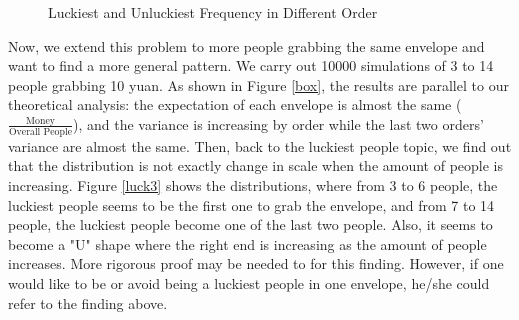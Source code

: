 \documentclass{scrartcl}
\begin{document}
\begin{figure}[H]
\centering    
{}     
\caption{Luckiest and Unluckiest Frequency in Different Order}     
\label{lucksim} 
\end{figure}
\par
Now, we extend this problem to more people grabbing the same envelope and want to find a more general pattern. We carry out 10000 simulations of 3 to 14 people grabbing 10 yuan. As shown in Figure \ref{box}, the results are parallel to our theoretical analysis: the expectation of each envelope is almost the same ($\frac{\text{Money}}{\text{Overall People}}$), and the variance is increasing by order while the last two orders' variance are almost the same. Then, back to the luckiest people topic, we find out that the distribution is not exactly change in scale when the amount of people is increasing. Figure \ref{luck3} shows the distributions, where from 3 to 6 people, the luckiest people seems to be the first one to grab the envelope, and from 7 to 14 people, the luckiest people become one of the last two people. Also, it seems to become a "U" shape where the 
right end is increasing as the amount of people increases. More rigorous proof may be needed to for this finding. However, if one would like to be or avoid being a luckiest people in one envelope, he/she could refer to the finding above.
\end{document}
